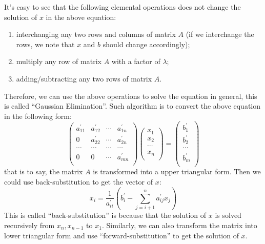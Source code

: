 It's easy to see that the following elemental operations does not change the 
solution of $x$ in the above equation:
\begin{enumerate}
 \item interchanging any two rows and columns of matrix $A$ (if we interchange
 the rows, we note that $x$ and $b$ should change accordingly);
 \item multiply any row of matrix $A$ with a factor of $\lambda$;
 \item adding/subtracting any two rows of matrix $A$.
\end{enumerate}

Therefore, we can use the above operations to solve the equation in general, 
this is called ``Gaussian Elimination''. Such algorithm is to convert the above 
equation in the following form:
\begin{equation}
 \label{Solution_Linear_Equations_eq:3}
 \begin{pmatrix}
a_{11}^{'}  &  a_{12}^{'}  & \cdots  & a_{1n}^{'} \\ 
0           &  a_{22}^{'}  & \cdots  & a_{2n}^{'} \\ 
\cdots      &  \cdots      & \cdots  & \cdots \\ 
0           &  0           & \cdots  & a_{mn}^{'} \\ 
\end{pmatrix}
\begin{pmatrix}
 x_{1} \\
 x_{2} \\
 \cdots \\
 x_{n} \\
\end{pmatrix}
= 
\begin{pmatrix}
 b_{1}^{'} \\
 b_{2}^{'} \\
 \cdots \\
 b_{m}^{'} \\
\end{pmatrix}
\end{equation}
that is to say, the matrix $A$ is transformed into a upper triangular form. Then
we could use back-substitution to get the vector of $x$:
\begin{equation}
 \label{Solution_Linear_Equations_eq:4}
 x_{i} = \frac{1}{a_{ii}^{'}}\left( b_{i}^{'} - \sum_{j=i+1}^{n}a_{ij}^{'}x_{j}\right) 
\end{equation} 
This is called ``back-substitution'' is because that the solution of $x$ is solved 
recursively from $x_{n}, x_{n-1}$ to $x_{1}$. Similarly, we can also transform the 
matrix into lower triangular form and use ``forward-substitution'' to get the solution
of $x$.

